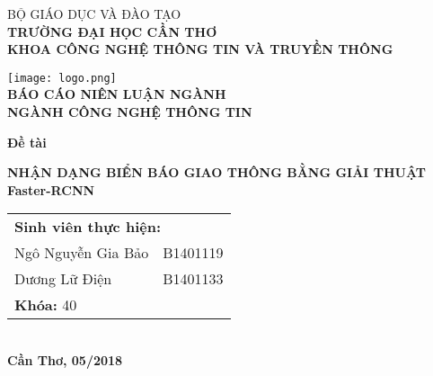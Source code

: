 \documentclass[../thesis.tex]{subfiles}
\begin{document}
\begin{titlepage}

\begin{center}

BỘ GIÁO DỤC VÀ ĐÀO TẠO\\
\textbf{TRƯỜNG ĐẠI HỌC CẦN THƠ\\}
\textbf{KHOA CÔNG NGHỆ THÔNG TIN VÀ TRUYỀN THÔNG\\[1cm]}

\texttt{[image: logo.png]}\\[1cm]

\textbf{BÁO CÁO NIÊN LUẬN NGÀNH\\}
\textbf{NGÀNH CÔNG NGHỆ THÔNG TIN\\[2cm]}

\begin{large}
\textbf{Đề tài\\[0.5cm]}
\end{large}
\textbf{{\LARGE NHẬN DẠNG BIỂN BÁO GIAO THÔNG BẰNG GIẢI THUẬT Faster-RCNN}}
\\[3.5cm]

\begin{tabular}{ l l }
	\multicolumn{2}{l}{\textbf{Sinh viên thực hiện:}}\\ 
	Ngô Nguyễn Gia Bảo & B1401119\\  
	Dương Lữ Điện & B1401133\\
	\multicolumn{2}{l}{\textbf{Khóa:} 40}\\   
\end{tabular}
\\[4cm]

\textbf{Cần Thơ, 05/2018}

\end{center}

\end{titlepage}
\end{document}
